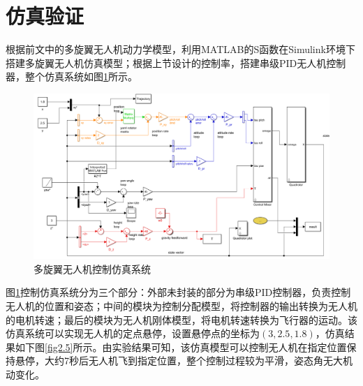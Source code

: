 \section{仿真验证}
根据前文中的多旋翼无人机动力学模型，利用MATLAB的S函数在Simulink环境下搭建多旋翼无人机仿真模型；根据上节设计的控制率，搭建串级PID无人机控制器，整个仿真系统如图\ref{fig2.4}所示。
\begin{figure}[h]
\centering
    
		\includegraphics[scale=0.4]{figures/Fig2.4.png}
	
\caption{多旋翼无人机控制仿真系统}
\label{fig2.4}
\end{figure}

图\ref{fig2.4}控制仿真系统分为三个部分：外部未封装的部分为串级PID控制器，负责控制无人机的位置和姿态；中间的模块为控制分配模型，将控制器的输出转换为无人机的电机转速；最后的模块为无人机刚体模型，将电机转速转换为飞行器的运动。该仿真系统可以实现无人机的定点悬停，设置悬停点的坐标为$(3,2.5,1.8)$，仿真结果如下图\ref{fig2.5}所示。由实验结果可知，该仿真模型可以控制无人机在指定位置保持悬停，大约7秒后无人机飞到指定位置，整个控制过程较为平滑，姿态角无大机动变化。

